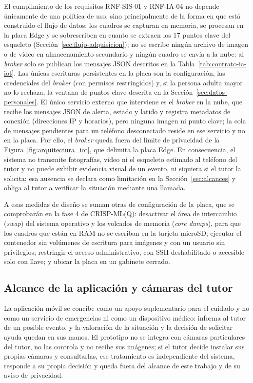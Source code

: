 \documentclass[12pt,a4paper,oneside]{book}
\theoremstyle{plain}
\theoremstyle{definition}
\theoremstyle{remark}
\begin{document}
El cumplimiento de los requisitos RNF-SIS-01 y RNF-IA-04 no depende únicamente de una política de uso, sino principalmente de la forma en que está construido el flujo de datos: los cuadros se capturan en memoria, se procesan en la placa Edge y se sobrescriben en cuanto se extraen los 17 puntos clave del esqueleto (Sección~\ref{sec:flujo-adquisicion}); no se escribe ningún archivo de imagen o de video en almacenamiento secundario y ningún cuadro se envía a la nube: al \textit{broker} solo se publican los mensajes JSON descritos en la Tabla~\ref{tab:contrato-ia-iot}. Las únicas escrituras persistentes en la placa son la configuración, las credenciales del \textit{broker} (con permisos restringidos) y, si la persona adulta mayor no lo rechaza, la ventana de puntos clave descrita en la Sección~\ref{sec:datos-personales}. El único servicio externo que interviene es el \textit{broker} en la nube, que recibe los mensajes JSON de alerta, estado y latido y registra metadatos de conexión (direcciones IP y horarios), pero ninguna imagen ni punto clave; la cola de mensajes pendientes para un teléfono desconectado reside en ese servicio y no en la placa. Por ello, el \textit{broker} queda fuera del límite de privacidad de la Figura~\ref{fig:arquitectura_iot}, que delimita la placa Edge. En consecuencia, el sistema no transmite fotografías, video ni el esqueleto estimado al teléfono del tutor y no puede exhibir evidencia visual de un evento, ni siquiera si el tutor la solicita; esa ausencia se declara como limitación en la Sección~\ref{sec:alcances} y obliga al tutor a verificar la situación mediante una llamada.

A esas medidas de diseño se suman otras de configuración de la placa, que se comprobarán en la fase 4 de CRISP-ML(Q): desactivar el área de intercambio (\textit{swap}) del sistema operativo y los volcados de memoria (\textit{core dumps}), para que los cuadros que están en RAM no se escriban en la tarjeta microSD; ejecutar el contenedor sin volúmenes de escritura para imágenes y con un usuario sin privilegios; restringir el acceso administrativo, con SSH deshabilitado o accesible solo con llave; y ubicar la placa en un gabinete cerrado.

\subsection{Alcance de la aplicación y cámaras del tutor}

La aplicación móvil se concibe como un apoyo suplementario para el cuidado y no como un servicio de emergencias ni como un dispositivo médico: informa al tutor de un posible evento, y la valoración de la situación y la decisión de solicitar ayuda quedan en sus manos. El prototipo no se integra con cámaras particulares del tutor, no las controla y no recibe sus imágenes; si el tutor decide instalar sus propias cámaras y consultarlas, ese tratamiento es independiente del sistema, responde a su propia decisión y queda fuera del alcance de este trabajo y de su aviso de privacidad.
\end{document}
